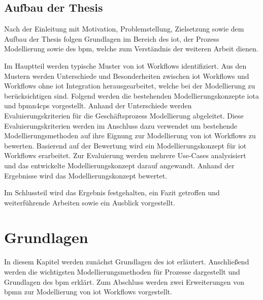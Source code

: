 \documentclass[a4paper, 12pt, twoside, headsepline=true]{scrartcl} %
\begin{document}
\subsection{Aufbau der Thesis}
Nach der Einleitung mit Motivation, Problemstellung, Zielsetzung sowie dem Aufbau der Thesis folgen Grundlagen im Bereich des \ac{iot}, der Prozess Modellierung sowie des \ac{bpm}, welche zum Verständnis der weiteren Arbeit dienen.
 
 Im Hauptteil werden typische Muster von \ac{iot} Workflows identifiziert. Aus den Mustern werden Unterschiede und Besonderheiten zwischen \ac{iot} Workflows und Workflows ohne \ac{iot} Integration herausgearbeitet, welche bei der Modellierung zu berücksichtigen sind. Folgend werden die bestehenden Modellierungskonzepte \ac{iota} und \ac{bpmn4cps} vorgestellt.
 Anhand der Unterschiede werden Evaluierungskriterien für die Geschäftsprozess Modellierung abgeleitet. Diese Evaluierungskriterien werden im Anschluss dazu verwendet um bestehende Modellierungsmethoden auf ihre Eignung zur Modellierung von \ac{iot} Workflows zu bewerten. Basierend auf der Bewertung wird ein Modellierungskonzept für \ac{iot} Workflows erarbeitet. Zur Evaluierung werden mehrere Use-Cases analysisiert und das entwickelte Modellierungskonzept darauf angewandt. Anhand der Ergebnisse wird das Modellierungskonzept bewertet.
 
Im Schlussteil wird das Ergebnis festgehalten, ein Fazit getroffen und weiterführende Arbeiten sowie ein Ausblick vorgestellt.
 
\newpage

\section{Grundlagen} \label{sec:section2}
In diesem Kapitel werden zunächst Grundlagen des \ac{iot} erläutert. Anschließend werden die wichtigsten Modellierungsmethoden für Prozesse dargestellt und Grundlagen des \ac{bpm} erklärt. Zum Abschluss werden zwei Erweiterungen von \ac{bpmn} zur Modellierung von \ac{iot} Workflows vorgestellt.
\end{document}
